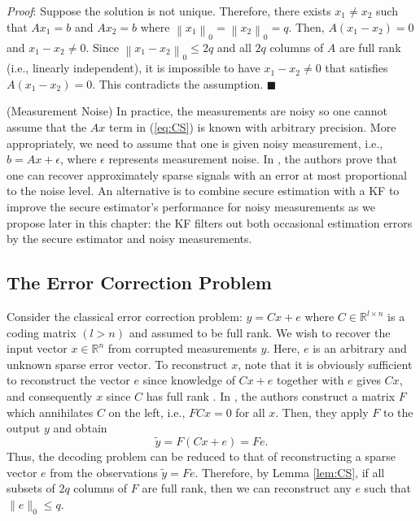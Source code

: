 \documentclass[../../thesis.tex]{subfiles}
\newcommand{\norm}[1]{\left\lVert#1\right\rVert}
\begin{document}
\textit{Proof}:
Suppose the solution is not unique. Therefore, there exists $x_1 \neq  x_2$ such that $Ax _1 = b$ and $Ax_2 = b$ where $\norm{x_1}_0 = \norm{x_2}_0 = q$. Then, $A(x_1 - x_2) = 0$ and $x_1 - x_2 \neq 0$. Since $\norm{x_1-x_2}_0 \leq 2q$ and all $2q$ columns of $A$ are full rank (i.e., linearly independent), it is impossible to have $x_1-x_2\neq 0$ that satisfies $A(x_1-x_2) = 0$. This contradicts the assumption.
\hfill$\blacksquare$


\begin{remark}
(Measurement Noise) In practice, the measurements are noisy so one cannot assume that the $Ax$ term in (\ref{eq:CS}) is known with arbitrary precision. More appropriately, we need to assume that one is given noisy measurement, i.e., $b = Ax + \epsilon$, where $\epsilon$ represents measurement noise. In \cite{Candes_Tao}, the authors prove that one can recover approximately sparse signals with an error at most proportional to the noise level. 
An alternative is to combine secure estimation with a KF to improve the secure estimator's performance for noisy measurements as we propose later in this chapter: the KF filters out both occasional estimation errors by the secure estimator and noisy measurements.
\end{remark}


\subsection{The Error Correction Problem \cite{tao11}}
Consider the classical error correction problem: $y=Cx + e$ where $C\in \mathbb{R}^{l\times n}$ is a coding matrix $(l > n)$ and assumed to be full rank. We wish to recover the input vector $x \in \mathbb{R}^n$ from corrupted measurements $y$. Here, $e$ is an arbitrary and unknown sparse error vector. To reconstruct $x$, note that it is obviously sufficient to reconstruct the vector $e$ since knowledge of $Cx + e$ together with $e$ gives $Cx$, and consequently $x$ since $C$ has full rank \cite{tao11}. In \cite{tao11}, the authors construct a matrix $F$ which annihilates $C$ on the left, i.e.,  $FCx = 0$ for all $x$. Then, they apply $F$ to the output $y$ and obtain
\begin{equation}
	\tilde y = F (Cx + e) = Fe.
\end{equation}
Thus, the decoding problem can be reduced to that of reconstructing a sparse vector $e$ from the observations $\tilde y = Fe$. Therefore, by Lemma \ref{lem:CS}, if all subsets of $2q$ columns of $F$ are full rank, then we can reconstruct any $e$ such that $\| e \|_0 \leq q$.
\end{document}
